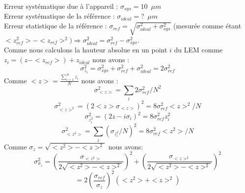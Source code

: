 Erreur systématique due à l'appareil : $\sigma_{sys} = 10$~$\mu m$ \\
Erreur systématique de la référence : $\sigma_{ideal} = $?~$\mu m$ \\
Erreur statistique de la référence : $\sigma_{ref} = \sqrt{\sigma_{ideal}^2 + \sigma_{sys}^2}$ (mesurée comme étant $<z_{ref}^2> - <z_{ref}>^2) \Rightarrow \sigma_{ideal}^2 = \sigma_{ref}^2 - \sigma_{sys}^2$.\\
Comme nous calculons la hauteur absolue en un point $i$ du LEM comme $z_i = (z - <z_{ref}>) + z_{ideal}$ nous avons :
\begin{equation}
    \sigma_{z_i}^2 = \sigma_{sys}^2 + \sigma_{ref}^2 + \sigma_{ideal}^2 = 2\sigma_{ref}^2
\end{equation}
Comme $<z> = \frac{\sum_{i=1}^N z_i}{N}$ nous avons :
\begin{equation}
    \sigma_{<z>}^2 = \sum_i 2\sigma_{ref}^2/N^2
\end{equation}
\begin{equation}
    \sigma_{<z>^2}^2 = (2<z>\sigma_{<z>})^2 = 8\sigma_{ref}^2<z>^2/N
\end{equation}
\begin{equation}
    \sigma_{z_i^2}^2 = (2z-i\sigma_i)^2 = 8\sigma_{ref}^2 z_i^2
\end{equation}
\begin{equation}
    \sigma_{<z^2>}^2 = \sum_i (\sigma_{z_i^2}/N)^2 = 8\sigma_{ref}^2<z^2>/N
\end{equation}
Comme $\sigma_z = \sqrt{<z^2> - <z>^2}$ nous avons:
\begin{equation}
    \sigma_{\sigma_z}^2 = \left(\frac{\sigma_{<z^2>}}{2\sqrt{<z^2> - <z>^2}}\right)^2 + \left(\frac{\sigma_{<z>^2}}{2\sqrt{<z^2> - <z>^2}}\right)^2 
\end{equation}
\begin{equation*}
    = 2\left(\frac{\sigma_{ref}}{\sigma_z}\right)^2(<z^2> + <z>^2)
\end{equation*}

